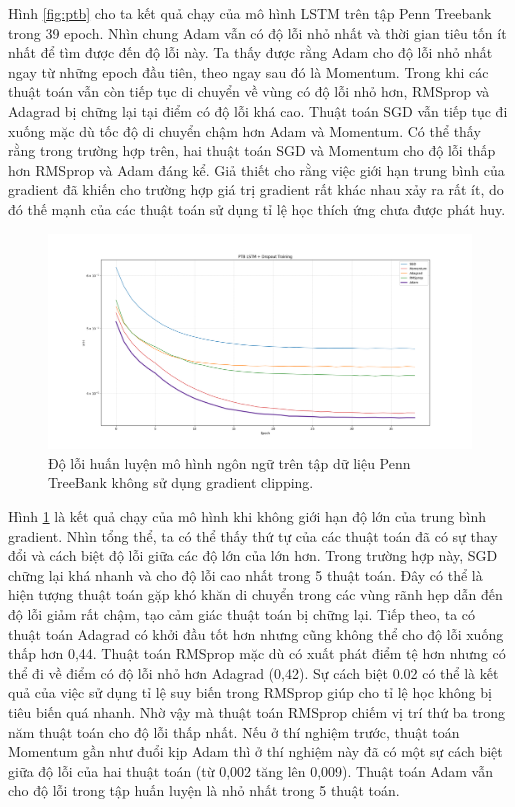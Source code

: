 Hình \ref{fig:ptb} cho ta kết quả chạy của mô hình LSTM trên tập Penn Treebank trong 39 epoch. Nhìn chung Adam vẫn có độ lỗi nhỏ nhất và thời gian tiêu tốn ít nhất để tìm được đến độ lỗi này. Ta thấy được rằng Adam cho độ lỗi nhỏ nhất ngay từ những epoch đầu tiên, theo ngay sau đó là Momentum. Trong khi các thuật toán vẫn còn tiếp tục di chuyển về vùng có độ lỗi nhỏ hơn, RMSprop và Adagrad bị chững lại tại điểm có độ lỗi khá cao. Thuật toán SGD vẫn tiếp tục đi xuống mặc dù tốc độ di chuyển chậm hơn Adam và Momentum. Có thể thấy rằng trong trường hợp trên, hai thuật toán SGD và Momentum cho độ lỗi thấp hơn RMSprop và Adam đáng kể. Giả thiết cho rằng việc giới hạn trung bình của gradient đã khiến cho trường hợp giá trị gradient rất khác nhau xảy ra rất ít, do đó thế mạnh của các thuật toán sử dụng tỉ lệ học thích ứng chưa được phát huy.

\begin{figure}[htp]
	\centering
	\includegraphics[width=140 mm]{images/ptb2.png}
	\caption{Độ lỗi huấn luyện mô hình ngôn ngữ trên tập dữ liệu Penn TreeBank không sử dụng gradient clipping.}
	\label{fig:ptb2}
\end{figure}

Hình \ref{fig:ptb2} là kết quả chạy của mô hình khi không giới hạn độ lớn của trung bình gradient. Nhìn tổng thể, ta có thể thấy thứ tự của các thuật toán đã có sự thay đổi và cách biệt độ lỗi giữa các độ lớn của lớn hơn. Trong trường hợp này, SGD chững lại khá nhanh và cho độ lỗi cao nhất trong 5 thuật toán. Đây có thể là hiện tượng thuật toán gặp khó khăn di chuyển trong các vùng rãnh hẹp dẫn đến độ lỗi giảm rất chậm, tạo cảm giác thuật toán bị chững lại. Tiếp theo, ta có thuật toán Adagrad có khởi đầu tốt hơn nhưng cũng không thể cho độ lỗi xuống thấp hơn 0,44. Thuật toán RMSprop mặc dù có xuất phát điểm tệ hơn nhưng có thể đi về điểm có độ lỗi nhỏ hơn Adagrad (0,42). Sự cách biệt 0.02 có thể là kết quả của việc sử dụng tỉ lệ suy biến trong RMSprop giúp cho tỉ lệ học không bị tiêu biến quá nhanh. Nhờ vậy mà thuật toán RMSprop chiếm vị trí thứ ba trong năm thuật toán cho độ lỗi thấp nhất. Nếu ở thí nghiệm trước, thuật toán Momentum gần như đuổi kịp Adam thì ở thí nghiệm này đã có một sự cách biệt giữa độ lỗi của hai thuật toán (từ 0,002 tăng lên 0,009). Thuật toán Adam vẫn cho độ lỗi trong tập huấn luyện là nhỏ nhất trong 5 thuật toán.

